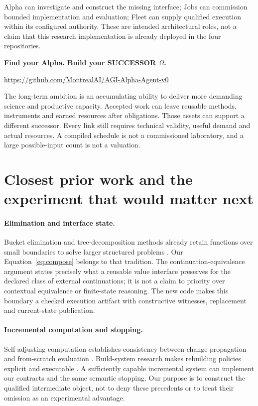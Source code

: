 \documentclass[11pt,letterpaper]{article}
\theoremstyle{definition}\newtheorem{definition}[theorem]{Definition}
\theoremstyle{remark}\newtheorem{remark}[theorem]{Remark}
\newcommand{\phead}[1]{\Needspace{4\baselineskip}\paragraph{#1}}
\begin{document}
Alpha can investigate and construct the missing interface; Jobs can commission bounded implementation and evaluation; Fleet can supply qualified execution within its configured authority. These are intended architectural roles, not a claim that this research implementation is already deployed in the four repositories.

\begin{center}
\textbf{Find your Alpha. Build your SUCCESSOR $\Omega$.}\par\smallskip
\url{https://github.com/MontrealAI/AGI-Alpha-Agent-v0}
\end{center}

The long-term ambition is an accumulating ability to deliver more demanding science and productive capacity. Accepted work can leave reusable methods, instruments and earned resources after obligations. Those assets can support a different successor. Every link still requires technical validity, useful demand and actual resources. A compiled schedule is not a commissioned laboratory, and a large possible-input count is not a valuation.

\section{Closest prior work and the experiment that would matter next}
\label{sec:related}
\phead{Elimination and interface state.}
Bucket elimination and tree-decomposition methods already retain functions over small boundaries to solve larger structured problems \citep{dechter,bodlaender}. Our Equation~\eqref{eq:compose} belongs to that tradition. The continuation-equivalence argument states precisely what a reusable value interface preserves for the declared class of external continuations; it is not a claim to priority over contextual equivalence or finite-state reasoning. The new code makes this boundary a checked execution artifact with constructive witnesses, replacement and current-state publication.

\phead{Incremental computation and stopping.}
Self-adjusting computation establishes consistency between change propagation and from-scratch evaluation \citep{acar}. Build-system research makes rebuilding policies explicit and executable \citep{build}. A sufficiently capable incremental system can implement our contracts and the same semantic stopping. Our purpose is to construct the qualified intermediate object, not to deny these precedents or to treat their omission as an experimental advantage.
\end{document}
